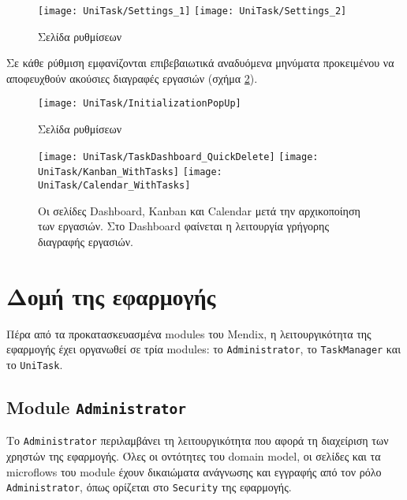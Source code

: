         \begin{figure}[h!] \noindent \centering
            \texttt{[image: UniTask/Settings\_1]}
            \texttt{[image: UniTask/Settings\_2]}
            \caption{\centering Σελίδα ρυθμίσεων}
            \label{fig:unitask_Settings}
        \end{figure}

        Σε κάθε ρύθμιση εμφανίζονται επιβεβαιωτικά αναδυόμενα μηνύματα προκειμένου να αποφευχθούν ακούσιες διαγραφές εργασιών (σχήμα \ref{fig:unitask_InitializationPopUp}).

        \begin{figure}[h!] \noindent \centering
            \texttt{[image: UniTask/InitializationPopUp]}
            \caption{\centering Σελίδα ρυθμίσεων}
            \label{fig:unitask_InitializationPopUp}
        \end{figure}

        \begin{figure}[p!] \noindent \centering
            \texttt{[image: UniTask/TaskDashboard\_QuickDelete]}
            \texttt{[image: UniTask/Kanban\_WithTasks]}
            \texttt{[image: UniTask/Calendar\_WithTasks]}
            \caption{\centering Οι σελίδες Dashboard, Kanban και Calendar μετά την αρχικοποίηση των εργασιών. Στο Dashboard φαίνεται η λειτουργία γρήγορης διαγραφής εργασιών.}
            \label{fig:unitask_Dashboard_Kanban_Calendar_WithTasks}
        \end{figure}

    \section{Δομή της εφαρμογής} \label{sec:unitask_mendix}
        Πέρα από τα προκατασκευασμένα modules του Mendix, η λειτουργικότητα της εφαρμογής έχει οργανωθεί σε τρία modules: το \texttt{Administrator}, το \texttt{TaskManager} και το \texttt{UniTask}.

        \subsection{Module \texttt{Administrator}}
            Το \texttt{Administrator} περιλαμβάνει τη λειτουργικότητα που αφορά τη διαχείριση των χρηστών της εφαρμογής. Όλες οι οντότητες του domain model, οι σελίδες και τα microflows του module έχουν δικαιώματα ανάγνωσης και εγγραφής από τον ρόλο \texttt{Administrator}, όπως ορίζεται στο \texttt{Security} της εφαρμογής.

